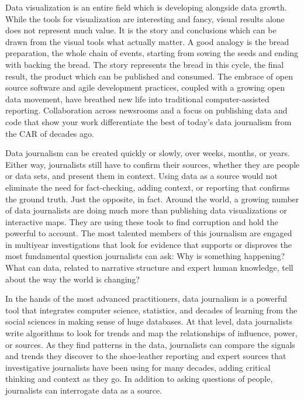 Data visualization is an entire field which is developing alongside data growth. While the tools for visualization are interesting and fancy, visual results alone does not represent much value. It is the story and conclusions which can be drawn from the visual tools what actually matter. A good analogy is the bread preparation, the whole chain of events, starting from sowing the seeds and ending with backing the bread. The story represents the bread in this cycle, the final result, the product which can be published and consumed. The embrace of open source software and agile development practices, coupled with a growing open data movement, have breathed new life into traditional computer-assisted reporting. Collaboration across newsrooms and a focus on publishing data and code that show your work differentiate the best of today’s data journalism from the CAR of decades ago.

Data journalism can be created quickly or slowly, over weeks, months, or years. Either way, journalists still have to confirm their sources, whether they are people or data sets, and present them in context. Using data as a source would not eliminate the need for fact-checking, adding context, or reporting that confirms the ground truth. Just the opposite, in fact. Around the world, a growing number of data journalists are doing much more than publishing data visualizations or interactive maps. They are using these tools to find corruption and hold the powerful to account. The most talented members of this journalism are engaged in multiyear investigations that look for evidence that supports or disproves the most fundamental question journalists can ask: Why is something happening? What can data, related to narrative structure and expert human knowledge, tell about the way the world is changing?

In the hands of the most advanced practitioners, data journalism is a powerful tool that integrates computer science, statistics, and decades of learning from the social sciences in making sense of huge databases. At that level, data journalists write algorithms to look for trends and map the relationships of influence, power, or sources. As they find patterns in the data, journalists can compare the signals and trends they discover to the shoe-leather reporting and expert sources that investigative journalists have been using for many decades, adding critical thinking and context as they go. In addition to asking questions of people, journalists can interrogate data as a source.

